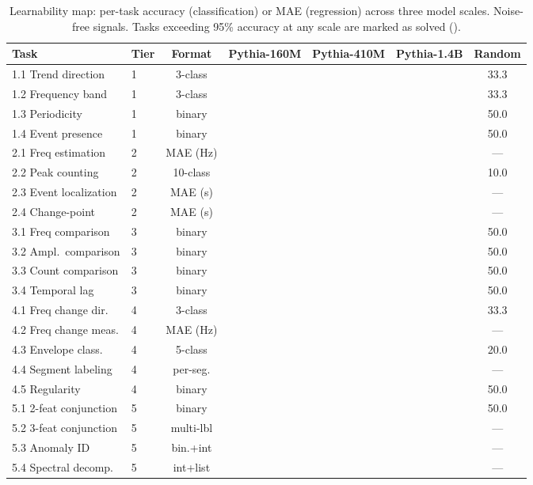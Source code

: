 \documentclass[11pt]{article}
\begin{document}
\begin{table}[t]
\centering
\small
\caption{Learnability map: per-task accuracy (classification) or MAE (regression) across three model scales. Noise-free signals. Tasks exceeding 95\% accuracy at any scale are marked as solved (\checkmark).}
\label{tab:learnability}
\begin{tabular}{llccccc}
\toprule
\textbf{Task} & \textbf{Tier} & \textbf{Format} & \textbf{Pythia-160M} & \textbf{Pythia-410M} & \textbf{Pythia-1.4B} & \textbf{Random} \\
\midrule
1.1 Trend direction     & 1 & 3-class   &  &  &  & 33.3 \\
1.2 Frequency band      & 1 & 3-class   &  &  &  & 33.3 \\
1.3 Periodicity         & 1 & binary    &  &  &  & 50.0 \\
1.4 Event presence      & 1 & binary    &  &  &  & 50.0 \\
\midrule
2.1 Freq estimation     & 2 & MAE (Hz)  &  &  &  & ---  \\
2.2 Peak counting       & 2 & 10-class  &  &  &  & 10.0 \\
2.3 Event localization  & 2 & MAE (s)   &  &  &  & ---  \\
2.4 Change-point        & 2 & MAE (s)   &  &  &  & ---  \\
\midrule
3.1 Freq comparison     & 3 & binary    &  &  &  & 50.0 \\
3.2 Ampl.\ comparison   & 3 & binary    &  &  &  & 50.0 \\
3.3 Count comparison    & 3 & binary    &  &  &  & 50.0 \\
3.4 Temporal lag        & 3 & binary    &  &  &  & 50.0 \\
\midrule
4.1 Freq change dir.    & 4 & 3-class   &  &  &  & 33.3 \\
4.2 Freq change meas.   & 4 & MAE (Hz)  &  &  &  & ---  \\
4.3 Envelope class.     & 4 & 5-class   &  &  &  & 20.0 \\
4.4 Segment labeling    & 4 & per-seg.  &  &  &  & ---  \\
4.5 Regularity          & 4 & binary    &  &  &  & 50.0 \\
\midrule
5.1 2-feat conjunction  & 5 & binary    &  &  &  & 50.0 \\
5.2 3-feat conjunction  & 5 & multi-lbl &  &  &  & ---  \\
5.3 Anomaly ID          & 5 & bin.+int  &  &  &  & ---  \\
5.4 Spectral decomp.    & 5 & int+list  &  &  &  & ---  \\
\bottomrule
\end{tabular}
\end{table}
\end{document}
